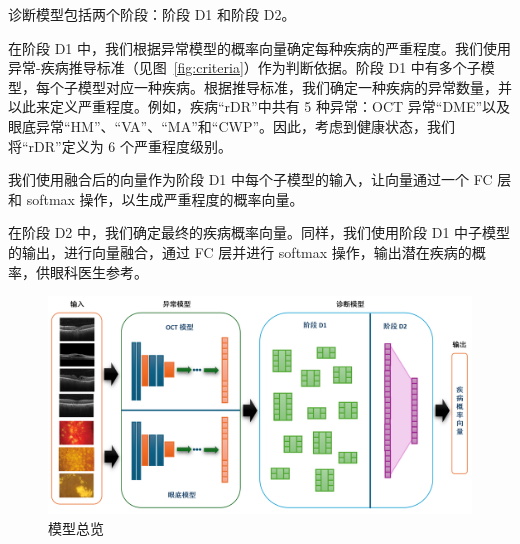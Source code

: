 \documentclass{article}
\begin{document}
\begin{multicols}{2}
	\vspace{0.5cm}
	
	诊断模型包括两个阶段：阶段 D1 和阶段 D2。
	
	\vspace{0.2cm}
	
	在阶段 D1 中，我们根据异常模型的概率向量确定每种疾病的严重程度。我们使用异常-疾病推导标准（见图~\ref{fig:criteria}）作为判断依据。阶段 D1 中有多个子模型，每个子模型对应一种疾病。根据推导标准，我们确定一种疾病的异常数量，并以此来定义严重程度。例如，疾病“rDR”中共有 5 种异常：OCT 异常“DME”以及眼底异常“HM”、“VA”、“MA”和“CWP”。因此，考虑到健康状态，我们将“rDR”定义为 6 个严重程度级别。
	
	我们使用融合后的向量作为阶段 D1 中每个子模型的输入，让向量通过一个 FC 层和 softmax 操作，以生成严重程度的概率向量。
	
	在阶段 D2 中，我们确定最终的疾病概率向量。同样，我们使用阶段 D1 中子模型的输出，进行向量融合，通过 FC 层并进行 softmax 操作，输出潜在疾病的概率，供眼科医生参考。
	
	\end{multicols}
	
	\begin{figure}[htbp]
		\centering
		\includegraphics[width=\linewidth]{Figs/model_overview.png}
		\caption{模型总览}
		\vspace{0.3cm}
		\label{fig:3_parts}
		\vspace{1cm}
	\end{figure}
	
\end{document}
